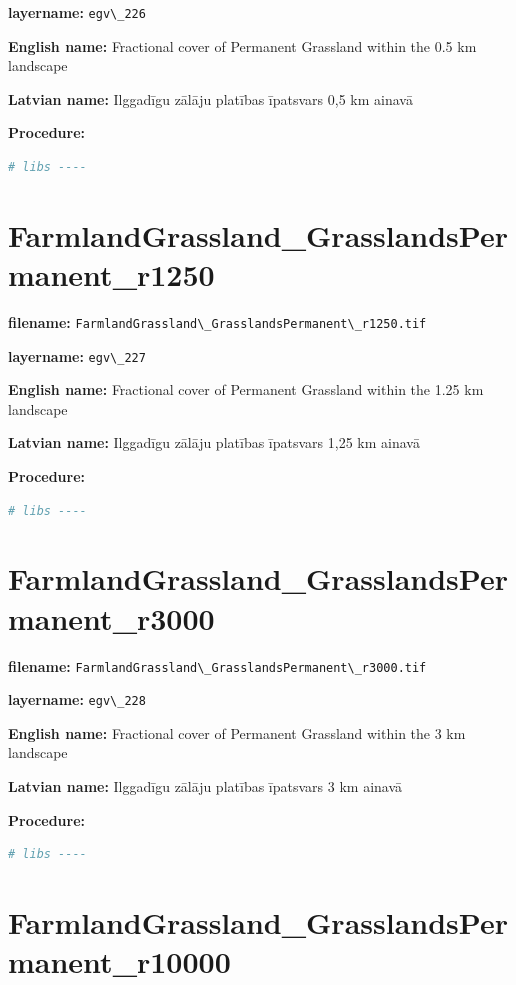 \documentclass[
]{book}
\newcommand{\passthrough}[1]{#1}
\begin{document}
\textbf{layername:} \passthrough{\lstinline!egv\_226!}

\textbf{English name:} Fractional cover of Permanent Grassland within the 0.5 km landscape

\textbf{Latvian name:} Ilggadīgu zālāju platības īpatsvars 0,5 km ainavā

\textbf{Procedure:}

\begin{lstlisting}[language=R]
# libs ----
\end{lstlisting}

\section{FarmlandGrassland\_GrasslandsPermanent\_r1250}\label{ch06.227}

\textbf{filename:} \passthrough{\lstinline!FarmlandGrassland\_GrasslandsPermanent\_r1250.tif!}

\textbf{layername:} \passthrough{\lstinline!egv\_227!}

\textbf{English name:} Fractional cover of Permanent Grassland within the 1.25 km landscape

\textbf{Latvian name:} Ilggadīgu zālāju platības īpatsvars 1,25 km ainavā

\textbf{Procedure:}

\begin{lstlisting}[language=R]
# libs ----
\end{lstlisting}

\section{FarmlandGrassland\_GrasslandsPermanent\_r3000}\label{ch06.228}

\textbf{filename:} \passthrough{\lstinline!FarmlandGrassland\_GrasslandsPermanent\_r3000.tif!}

\textbf{layername:} \passthrough{\lstinline!egv\_228!}

\textbf{English name:} Fractional cover of Permanent Grassland within the 3 km landscape

\textbf{Latvian name:} Ilggadīgu zālāju platības īpatsvars 3 km ainavā

\textbf{Procedure:}

\begin{lstlisting}[language=R]
# libs ----
\end{lstlisting}

\section{FarmlandGrassland\_GrasslandsPermanent\_r10000}\label{ch06.229}
\end{document}
